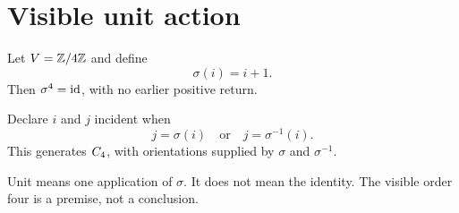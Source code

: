 \section{Visible unit action}

Let \(V=\mathbb{Z}/4\mathbb{Z}\) and define
\[
\sigma(i)=i+1.
\]
Then \(\sigma^4=\mathrm{id}\), with no earlier positive return.

Declare \(i\) and \(j\) incident when
\[
j=\sigma(i)\quad\text{or}\quad j=\sigma^{-1}(i).
\]
This generates \(C_{4}\), with orientations supplied by
\(\sigma\) and \(\sigma^{-1}\).

Unit means one application of \(\sigma\). It does not mean the
identity. The visible order four is a premise, not a conclusion.
